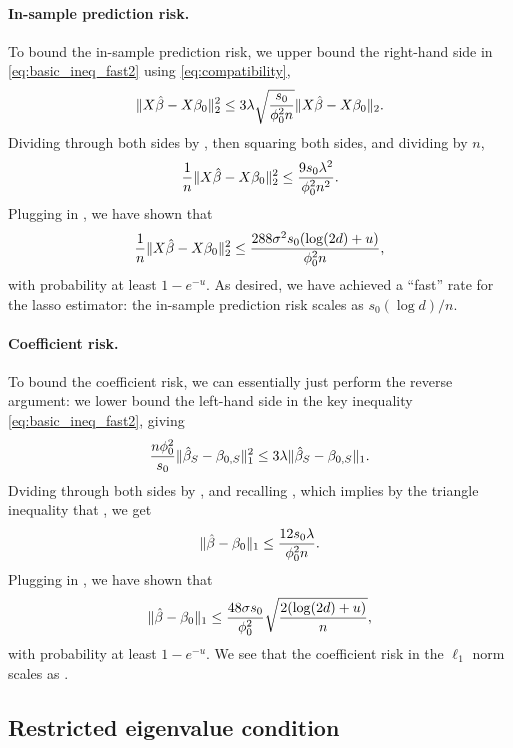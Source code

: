 \documentclass{article}
\begin{document}
\paragraph{In-sample prediction risk.}

To bound the in-sample prediction risk, we upper bound the right-hand side in
\eqref{eq:basic_ineq_fast2} using \eqref{eq:compatibility},  
\[
\|X\hat{\beta} - X\beta_0\|_2^2 \leq 3 \lambda \sqrt{\frac{s_0}{\phi_0^2 n}} 
\|X\hat{\beta} - X\beta_0\|_2.  
\]
Dividing through both sides by , then squaring
both sides, and dividing by $n$, 
\[
\frac{1}{n} \|X\hat{\beta} - X\beta_0\|_2^2 \leq \frac{9 s_0 \lambda^2}
  {\phi_0^2 n^2}.
\]
Plugging in , we have 
shown that 
\begin{equation}
\label{eq:risk_lasso_fast1}
\frac{1}{n} \|X\hat{\beta}-X\beta_0\|_2^2 \leq \frac{288 \sigma^2 s_0 (\log(2d) +
  u)}{\phi_0^2 n},    
\end{equation}
with probability at least $1-e^{-u}$. As desired, we have achieved a ``fast''
rate for the lasso estimator: the in-sample prediction risk scales as $s_0(\log
d)/n$.  

\paragraph{Coefficient risk.}

To bound the coefficient risk, we can essentially just perform the reverse
argument: we lower bound the left-hand side in the key inequality
\eqref{eq:basic_ineq_fast2}, giving  
\[
\frac{n \phi_0^2}{s_0} \|\hat{\beta}_S - \beta_{0,S} \|_1^2 \leq 3 \lambda 
 \|\hat{\beta}_S - \beta_{0,S}\|_1.
\]
Dviding through both sides by , and
recalling , which
implies by the triangle inequality that , we get
\[
\|\hat{\beta}-\beta_0\|_1 \leq \frac{12 s_0 \lambda}{\phi_0^2 n}.
\]
Plugging in , we have 
shown that 
\begin{equation}
\label{eq:risk_lasso_fast2}
\|\hat{\beta} - \beta_0\|_1 \leq \frac{48 \sigma s_0}{\phi_0^2}
\sqrt{\frac{2 (\log(2d) + u)}{n}},
\end{equation}
with probability at least $1-e^{-u}$. We see that the coefficient risk in the
$\ell_1$ norm scales as . 

\subsection{Restricted eigenvalue condition}
\end{document}
